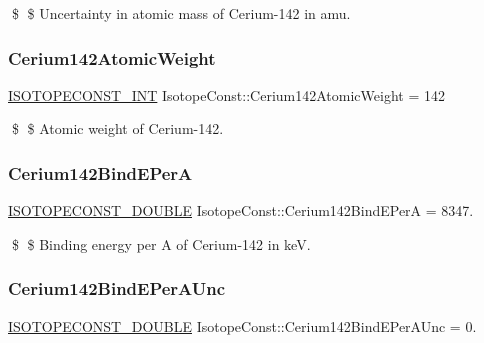 \$ \$ Uncertainty in atomic mass of Cerium-\/142 in amu. \mbox{\label{group___isotope_const-_cerium-_ce142_gaa8ba8a43904a5d60821731d5b0037e91}} 
\subsubsection{\texorpdfstring{Cerium142\+Atomic\+Weight}{Cerium142AtomicWeight}}
{\footnotesize\ttfamily \mbox{\hyperlink{group___isotope_const-_macros_ga5f18360b3e99483a35c32d789e62621c}{I\+S\+O\+T\+O\+P\+E\+C\+O\+N\+S\+T\+\_\+\+I\+NT}} Isotope\+Const\+::\+Cerium142\+Atomic\+Weight = 142}

\$ \$ Atomic weight of Cerium-\/142. \mbox{\label{group___isotope_const-_cerium-_ce142_ga0da4f4cf831ee4afaa1d4495775ac1db}} 
\subsubsection{\texorpdfstring{Cerium142\+Bind\+E\+PerA}{Cerium142BindEPerA}}
{\footnotesize\ttfamily \mbox{\hyperlink{group___isotope_const-_macros_ga8f45a7272ce02c0b4c65c44636ed719a}{I\+S\+O\+T\+O\+P\+E\+C\+O\+N\+S\+T\+\_\+\+D\+O\+U\+B\+LE}} Isotope\+Const\+::\+Cerium142\+Bind\+E\+PerA = 8347.}

\$ \$ Binding energy per A of Cerium-\/142 in keV. \mbox{\label{group___isotope_const-_cerium-_ce142_ga8ed166ff2af5d8af03ec98e65414565f}} 
\subsubsection{\texorpdfstring{Cerium142\+Bind\+E\+Per\+A\+Unc}{Cerium142BindEPerAUnc}}
{\footnotesize\ttfamily \mbox{\hyperlink{group___isotope_const-_macros_ga8f45a7272ce02c0b4c65c44636ed719a}{I\+S\+O\+T\+O\+P\+E\+C\+O\+N\+S\+T\+\_\+\+D\+O\+U\+B\+LE}} Isotope\+Const\+::\+Cerium142\+Bind\+E\+Per\+A\+Unc = 0.}


